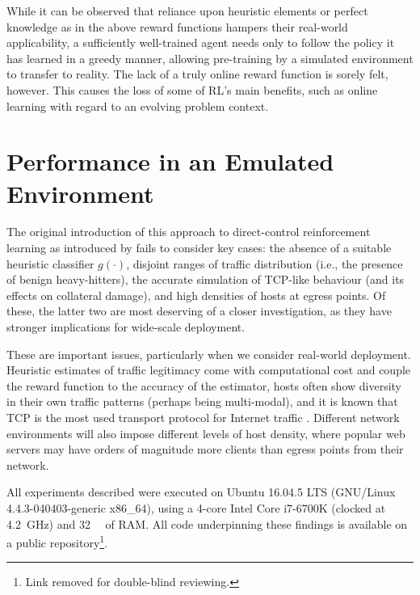 \documentclass[conference, a4paper, 10pt, times]{IEEEtran}
\begin{document}

While it can be observed that reliance upon heuristic elements or perfect knowledge as in the above reward functions hampers their real-world applicability, a sufficiently well-trained agent needs only to follow the policy it has learned in a greedy manner, allowing pre-training by a simulated environment to transfer to reality.
The lack of a truly online reward function is sorely felt, however.
This causes the loss of some of RL's main benefits, such as online learning with regard to an evolving problem context.

\section{Performance in an Emulated Environment}\label{sec:performance-in-an-emulated-environment}
The original introduction of this approach to direct-control reinforcement learning as introduced by \textcite{DBLP:journals/eaai/MalialisK15} fails to consider key cases: the absence of a suitable heuristic classifier $g(\cdot)$, disjoint ranges of traffic distribution (i.e., the presence of benign heavy-hitters), the accurate simulation of TCP-like behaviour (and its effects on collateral damage), and high densities of hosts at egress points.
Of these, the latter two are most deserving of a closer investigation, as they have stronger implications for wide-scale deployment.

These are important issues, particularly when we consider real-world deployment.
Heuristic estimates of traffic legitimacy come with computational cost and couple the reward function to the accuracy of the estimator, hosts often show diversity in their own traffic patterns (perhaps being multi-modal), and it is known that TCP is the most used transport protocol for Internet traffic \cite{DBLP:conf/saint/ZhangDJC09}.
Different network environments will also impose different levels of host density, where popular web servers may have orders of magnitude more clients than egress points from their network.

All experiments described were executed on Ubuntu 16.04.5 LTS (GNU/Linux 4.4.3-040403-generic x86\_64), using a 4-core Intel Core i7-6700K (clocked at \SI{4.2}{\giga\hertz}) and \SI{32}{\gibi\byte} of RAM.
All code underpinning these findings is available on a public repository\footnote{Link removed for double-blind reviewing.}.
\end{document}

